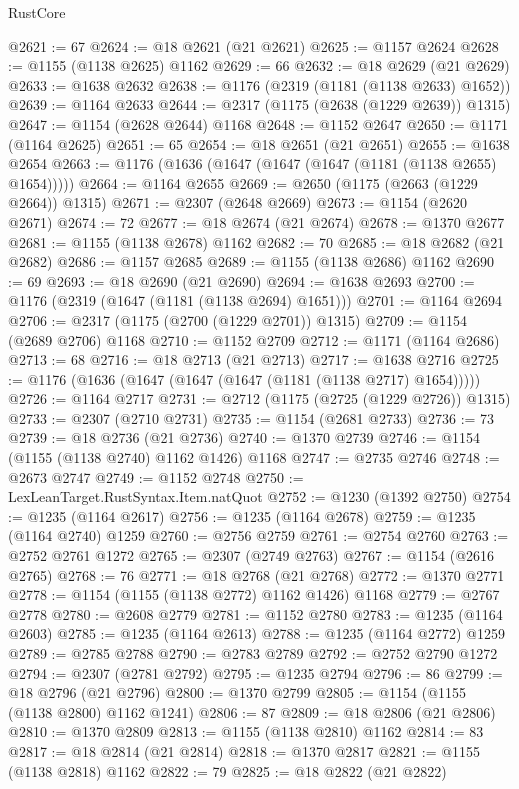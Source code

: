 \begin{lexlean}{RustCore}
\begin{coremodule}
@2621 := 67
@2624 := @18 @2621 (@21 @2621)
@2625 := @1157 @2624
@2628 := @1155 (@1138 @2625) @1162
@2629 := 66
@2632 := @18 @2629 (@21 @2629)
@2633 := @1638 @2632
@2638 := @1176 (@2319 (@1181 (@1138 @2633) @1652))
@2639 := @1164 @2633
@2644 := @2317 (@1175 (@2638 (@1229 @2639)) @1315)
@2647 := @1154 (@2628 @2644) @1168
@2648 := @1152 @2647
@2650 := @1171 (@1164 @2625)
@2651 := 65
@2654 := @18 @2651 (@21 @2651)
@2655 := @1638 @2654
@2663 := @1176 (@1636 (@1647 (@1647 (@1647 (@1181 (@1138 @2655) @1654)))))
@2664 := @1164 @2655
@2669 := @2650 (@1175 (@2663 (@1229 @2664)) @1315)
@2671 := @2307 (@2648 @2669)
@2673 := @1154 (@2620 @2671)
@2674 := 72
@2677 := @18 @2674 (@21 @2674)
@2678 := @1370 @2677
@2681 := @1155 (@1138 @2678) @1162
@2682 := 70
@2685 := @18 @2682 (@21 @2682)
@2686 := @1157 @2685
@2689 := @1155 (@1138 @2686) @1162
@2690 := 69
@2693 := @18 @2690 (@21 @2690)
@2694 := @1638 @2693
@2700 := @1176 (@2319 (@1647 (@1181 (@1138 @2694) @1651)))
@2701 := @1164 @2694
@2706 := @2317 (@1175 (@2700 (@1229 @2701)) @1315)
@2709 := @1154 (@2689 @2706) @1168
@2710 := @1152 @2709
@2712 := @1171 (@1164 @2686)
@2713 := 68
@2716 := @18 @2713 (@21 @2713)
@2717 := @1638 @2716
@2725 := @1176 (@1636 (@1647 (@1647 (@1647 (@1181 (@1138 @2717) @1654)))))
@2726 := @1164 @2717
@2731 := @2712 (@1175 (@2725 (@1229 @2726)) @1315)
@2733 := @2307 (@2710 @2731)
@2735 := @1154 (@2681 @2733)
@2736 := 73
@2739 := @18 @2736 (@21 @2736)
@2740 := @1370 @2739
@2746 := @1154 (@1155 (@1138 @2740) @1162 @1426) @1168
@2747 := @2735 @2746
@2748 := @2673 @2747
@2749 := @1152 @2748
@2750 := LexLeanTarget.RustSyntax.Item.natQuot
@2752 := @1230 (@1392 @2750)
@2754 := @1235 (@1164 @2617)
@2756 := @1235 (@1164 @2678)
@2759 := @1235 (@1164 @2740) @1259
@2760 := @2756 @2759
@2761 := @2754 @2760
@2763 := @2752 @2761 @1272
@2765 := @2307 (@2749 @2763)
@2767 := @1154 (@2616 @2765)
@2768 := 76
@2771 := @18 @2768 (@21 @2768)
@2772 := @1370 @2771
@2778 := @1154 (@1155 (@1138 @2772) @1162 @1426) @1168
@2779 := @2767 @2778
@2780 := @2608 @2779
@2781 := @1152 @2780
@2783 := @1235 (@1164 @2603)
@2785 := @1235 (@1164 @2613)
@2788 := @1235 (@1164 @2772) @1259
@2789 := @2785 @2788
@2790 := @2783 @2789
@2792 := @2752 @2790 @1272
@2794 := @2307 (@2781 @2792)
@2795 := @1235 @2794
@2796 := 86
@2799 := @18 @2796 (@21 @2796)
@2800 := @1370 @2799
@2805 := @1154 (@1155 (@1138 @2800) @1162 @1241)
@2806 := 87
@2809 := @18 @2806 (@21 @2806)
@2810 := @1370 @2809
@2813 := @1155 (@1138 @2810) @1162
@2814 := 83
@2817 := @18 @2814 (@21 @2814)
@2818 := @1370 @2817
@2821 := @1155 (@1138 @2818) @1162
@2822 := 79
@2825 := @18 @2822 (@21 @2822)

\end{coremodule}
\end{lexlean}
